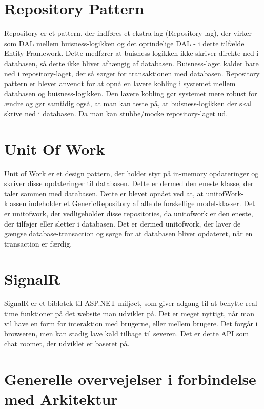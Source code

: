 \section{Repository Pattern}
Repository er et pattern, der indføres et ekstra lag (Repository-lag), der virker som DAL mellem buisness-logikken og det oprindelige DAL - i dette tilfælde Entity Framework. Dette medfører at buisness-logikken ikke skriver direkte ned i databasen, så dette ikke bliver afhængig af databasen. Buisness-laget kalder bare ned i repository-laget, der så sørger for transaktionen med databasen. 
Repository pattern er blevet anvendt for at opnå en lavere kobling i systemet mellem databasen og buisness-logikken. Den lavere kobling gør systemet mere robust for ændre og gør samtidig også, at man kan teste på, at buisness-logikken der skal skrive ned i databasen. Da man kan stubbe/mocke repository-laget ud.

\section{Unit Of Work}
Unit of Work er et design pattern, der holder styr på in-memory opdateringer og skriver disse opdateringer til databasen. Dette er dermed den eneste klasse, der taler sammen med databasen.
Dette er blevet opnået ved at, at unitofWork-klassen indeholder et GenericRepository af alle de forskellige model-klasser. Det er unitofwork, der vedligeholder disse repositories, da unitofwork er den eneste, der tilføjer eller sletter i databasen. Det er dermed unitofwork, der laver de gængse database-transaction og sørge for at databasen bliver opdateret, når en transaction er færdig.

\section{SignalR}
SignalR er et biblotek til ASP.NET miljøet, som giver adgang til at benytte real-time funktioner på det website man udvikler på. Det er meget nyttigt, når man vil have en form for interaktion med brugerne, eller mellem brugere. Det forgår i browseren, men kan stadig lave kald tilbage til severen. Det er dette API som chat roomet, der udviklet er baseret på. 

\section{Generelle overvejelser i forbindelse med Arkitektur}